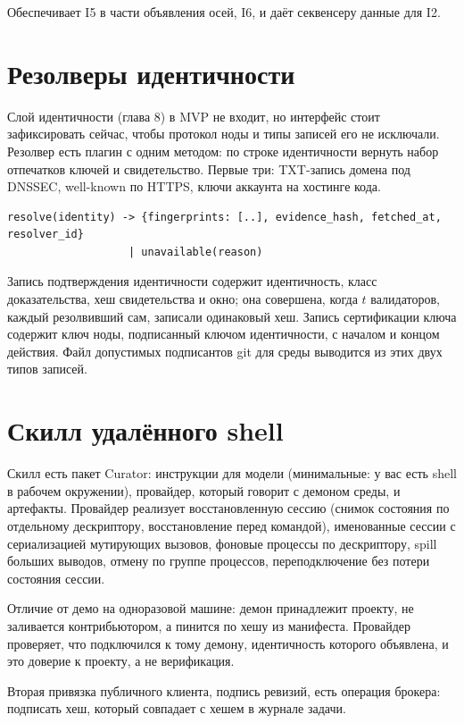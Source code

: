 Обеспечивает I5 в части объявления осей, I6, и даёт секвенсеру данные для I2.

\section{Резолверы идентичности}

Слой идентичности (глава 8) в MVP не входит, но интерфейс стоит зафиксировать сейчас, чтобы протокол ноды и типы записей его не исключали. Резолвер есть плагин с одним методом: по строке идентичности вернуть набор отпечатков ключей и свидетельство. Первые три: TXT-запись домена под DNSSEC, well-known по HTTPS, ключи аккаунта на хостинге кода.

\begin{exbox}
\begin{lstlisting}
resolve(identity) -> {fingerprints: [..], evidence_hash, fetched_at, resolver_id}
                   | unavailable(reason)
\end{lstlisting}
Запись подтверждения идентичности содержит идентичность, класс доказательства, хеш свидетельства и окно; она совершена, когда $t$ валидаторов, каждый резолвивший сам, записали одинаковый хеш. Запись сертификации ключа содержит ключ ноды, подписанный ключом идентичности, с началом и концом действия. Файл допустимых подписантов git для среды выводится из этих двух типов записей.
\end{exbox}

\section{Скилл удалённого shell}

Скилл есть пакет Curator: инструкции для модели (минимальные: у вас есть shell в рабочем окружении), провайдер, который говорит с демоном среды, и артефакты. Провайдер реализует восстановленную сессию (снимок состояния по отдельному дескриптору, восстановление перед командой), именованные сессии с сериализацией мутирующих вызовов, фоновые процессы по дескриптору, spill больших выводов, отмену по группе процессов, переподключение без потери состояния сессии.

Отличие от демо на одноразовой машине: демон принадлежит проекту, не заливается контрибьютором, а пинится по хешу из манифеста. Провайдер проверяет, что подключился к тому демону, идентичность которого объявлена, и это доверие к проекту, а не верификация.

Вторая привязка публичного клиента, подпись ревизий, есть операция брокера: подписать хеш, который совпадает с хешем в журнале задачи.

